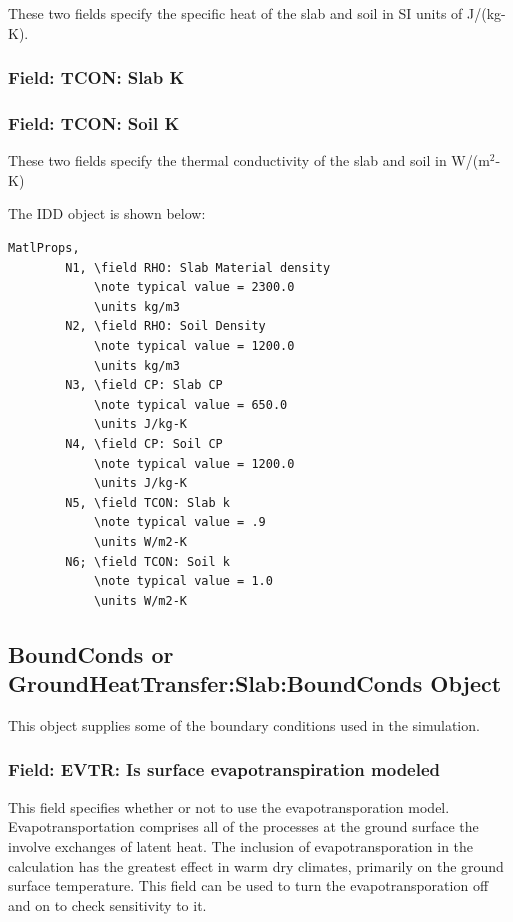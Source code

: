 These two fields specify the specific heat of the slab and soil in SI units of J/(kg-K).

\subsubsection{Field: TCON: Slab K}\label{field-tcon-slab-k}

\subsubsection{Field: TCON: Soil K}\label{field-tcon-soil-k}

These two fields specify the thermal conductivity of the slab and soil in W/(m\(^{2}\)-K)

The IDD object is shown below:

\begin{lstlisting}
MatlProps,
        N1, \field RHO: Slab Material density
            \note typical value = 2300.0
            \units kg/m3
        N2, \field RHO: Soil Density
            \note typical value = 1200.0
            \units kg/m3
        N3, \field CP: Slab CP
            \note typical value = 650.0
            \units J/kg-K
        N4, \field CP: Soil CP
            \note typical value = 1200.0
            \units J/kg-K
        N5, \field TCON: Slab k
            \note typical value = .9
            \units W/m2-K
        N6; \field TCON: Soil k
            \note typical value = 1.0
            \units W/m2-K
\end{lstlisting}

\subsection{BoundConds or GroundHeatTransfer:Slab:BoundConds Object}\label{boundconds-or-groundheattransferslabboundconds-object}

This object supplies some of the boundary conditions used in the simulation.

\subsubsection{Field: EVTR: Is surface evapotranspiration modeled}\label{field-evtr-is-surface-evapotranspiration-modeled}

This field specifies whether or not to use the evapotransporation model. Evapotransportation comprises all of the processes at the ground surface the involve exchanges of latent heat. The inclusion of evapotransporation in the calculation has the greatest effect in warm dry climates, primarily on the ground surface temperature. This field can be used to turn the evapotransporation off and on to check sensitivity to it.

